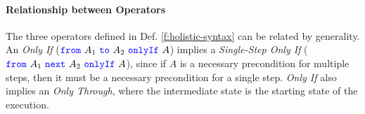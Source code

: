\paragraph{Relationship between \Nec Operators}
The three \Nec operators defined in Def. \ref{f:holistic-syntax}
can be related by generality. An \emph{Only If} (${\color{blue}\texttt{from}}\ A_1\ {\color{blue}\texttt{to}}\ A_2\ {\color{blue}\texttt{onlyIf}}\ A$) implies
a \emph{Single-Step Only If} (${\color{blue}\texttt{from}}\ A_1\ {\color{blue}\texttt{next}}\ A_2\ {\color{blue}\texttt{onlyIf}}\ A$), since if $A$ is 
a necessary precondition for multiple steps, then it must be a necessary 
precondition for a single step. \emph{Only If} also implies 
an \emph{Only Through}, where the intermediate state is the starting state
of the execution.

\subsection{}

